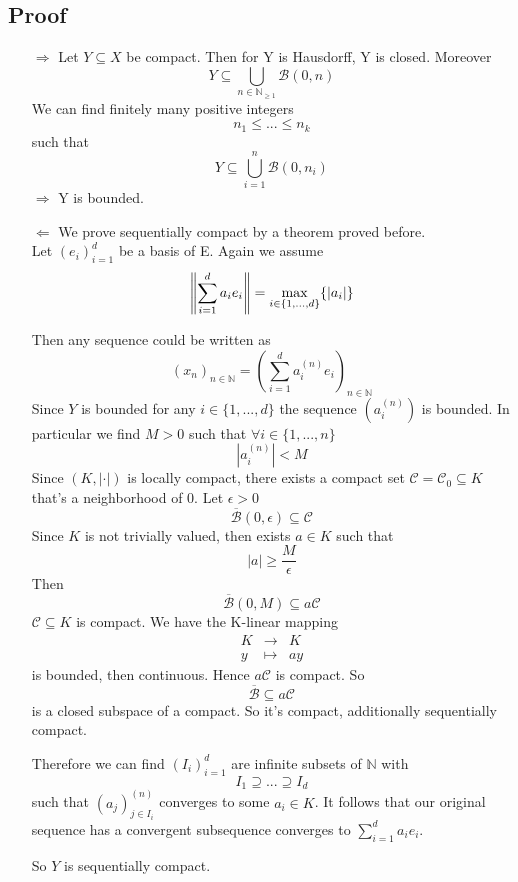 \documentclass{book}
\newcommand{\abs}[1]{\left\lvert #1 \right\rvert}
\begin{document}
\subsection*{Proof}
\begin{itemize}
    \item [$\Rightarrow$]Let $Y\subseteq X$ be compact. Then for Y is Hausdorff, Y is closed. Moreover $$Y\subseteq \bigcup\limits_{n\in \mathbb{N}_{\geq 1}}\mathcal{B}(0,n)$$ We can find finitely many positive integers $$n_1\leq ...\leq n_k$$ such that $$Y\subseteq\bigcup\limits_{i=1}^n\mathcal{B}(0,n_i)$$$\Rightarrow$ Y is bounded.
    \item [$\Leftarrow$]
    We prove sequentially compact by a theorem proved before.\\
    Let $(e_i)_{i=1}^d$ be a basis of E. Again we assume $$\norm{\sum\limits_{i=1}^da_ie_i}=\max\limits_{i\in \{1,...,d\}}\{\abs{a_i}\}$$
    

    Then any sequence could be written as$$(x_n)_{n\in \mathbb{N}}=(\sum\limits_{i=1}^da_i^{(n)}e_i)_{n\in\mathbb{N}}$$
    Since $Y$ is bounded for any $i\in \{1,...,d\}$ the sequence $(a_i^{(n)})$ is bounded. In particular we find $M>0$ such that 
    $\forall i\in \{1,...,n\}$
    $$\abs{a_i^{(n)}}<M$$
    Since $(K,\abs{\cdot})$ is locally compact, there exists a compact set $\mathcal{C}=\mathcal{C}_0\subseteq K$ that's a neighborhood of 0. Let $\epsilon>0$
    $$\overline{\mathcal{B}}(0,\epsilon)\subseteq\mathcal{C}$$
    Since $K$ is not trivially valued, then exists $a\in K$ such that $$\abs{a}\geq\frac{M}{\epsilon}$$
    Then $$\overline{\mathcal{B}}(0,M)\subseteq a\mathcal{C}$$
    $\mathcal{C}\subseteq K$ is compact. We have the K-linear mapping 
    $$\begin{aligned}
        K &\rightarrow &K\\ y &\mapsto &ay
    \end{aligned}$$
    is bounded, then continuous. Hence $a\mathcal{C}$ is compact. So $$\overline{\mathcal{B}}\subseteq a\mathcal{C}$$ is a closed subspace of a compact. So it's compact, additionally sequentially compact.

    Therefore we can find $(I_i)_{i=1}^d$ are infinite subsets of $\mathbb{N}$ with $$I_1\supseteq ...\supseteq I_d$$ such that $(a_j)_{j\in I_i}^{(n)}$ converges to some $a_i\in K$. It follows that our original sequence has a convergent subsequence converges to $\sum\limits_{i=1}^da_ie_i$.

    So $Y$ is sequentially compact.
\end{itemize}
\end{document}
